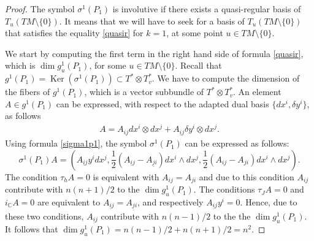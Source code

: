 \documentclass[pdftex]{sigma}
\numberwithin{equation}{section}
\begin{document}
\begin{proof}
The symbol $\sigma^1(P_1)$ is involutive if there exists
a quasi-regular basis of $T_u(TM\setminus\{0\})$. It means that we will
have to seek for a basis of $T_u(TM\setminus\{0\})$ that satisf\/ies
the equality \eqref{quasir} for $k=1$, at some point $u\in TM\setminus\{0\}$.

We start by computing the f\/irst term in the right hand side of formula
\eqref{quasir}, which is $\dim g^1_u(P_1)$, for some $u\in
TM\setminus\{0\}$. Recall that $g^1(P_1)=\operatorname{Ker} \left(\sigma^1(P_1)\right)
\subset T^*\otimes T^*_v$.  We have to compute the dimension of
the f\/ibers of $g^1(P_1)$, which is a vector subbundle of $ T^*\otimes T^*_v$. An element $A\in
g^1(P_1)$ can be expressed, with respect to the adapted dual basis
$\{dx^i, \delta y^i\}$, as follows
\begin{gather*}
A=A_{ij}dx^i\otimes dx^j + A_{\underline{i}j}\delta y^i \otimes
dx^j. %
\end{gather*} Using formula \eqref{sigma1p1},
the symbol $\sigma^1(P_1)$ can be expressed as follows:
\[
\sigma^1(P_1)A=\left( A_{\underline{i}j}y^idx^j, \frac{1}{2}(
A_{\underline{i}j}- A_{\underline{j}i})dx^i\wedge dx^j,
\frac{1}{2}(A_{ij}- A_{ji})dx^i\wedge dx^j\right).
\]
The condition $\tau_hA=0$ is equivalent with $A_{ij}=A_{ji}$ and due
to this condition $A_{ij}$ contribute with $n(n+1)/2$ to the $\dim g^1_u(P_1)$. The conditions
$\tau_JA=0$ and $i_{\mathbb{C}}A=0$ are equivalent to
$A_{\underline{i}j}=A_{\underline{j}i}$, and respectively
$A_{\underline{i}j}y^i=0$. Hence, due to these two conditions,
$A_{\underline{i}j}$ contribute
with $n(n-1)/2$ to the the $\dim g^1_u(P_1)$. It follows that $\dim
g^{1}_u(P_1)=n(n-1)/2 + n(n+1)/2 = n^2.$


\end{proof}
\end{document}
